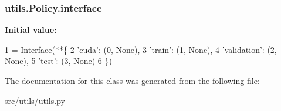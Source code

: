 \subsubsection[{\texorpdfstring{interface}{interface}}]{\setlength{\rightskip}{0pt plus 5cm}utils.\+Policy.\+interface\hspace{0.3cm}{\ttfamily [static]}}\hypertarget{classutils_1_1Policy_a671b846aa8597a6b96a69f56b23acf41}{}\label{classutils_1_1Policy_a671b846aa8597a6b96a69f56b23acf41}
{\bfseries Initial value\+:}
\begin{DoxyCode}
1 = Interface(**\{
2         \textcolor{stringliteral}{'cuda'}:         (0, \textcolor{keywordtype}{None}),
3         \textcolor{stringliteral}{'train'}:        (1, \textcolor{keywordtype}{None}),
4         \textcolor{stringliteral}{'validation'}:   (2, \textcolor{keywordtype}{None}),
5         \textcolor{stringliteral}{'test'}:         (3, \textcolor{keywordtype}{None})
6     \})
\end{DoxyCode}


The documentation for this class was generated from the following file\+:\begin{DoxyCompactItemize}
\item 
src/utils/utils.\+py\end{DoxyCompactItemize}
